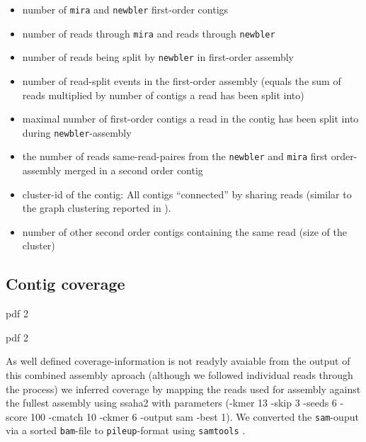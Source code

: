 \documentclass[12pt,a4paper]{article}
\begin{document}
\begin{itemize}
\item number of \texttt{mira} and \texttt{newbler} first-order contigs
\item number of reads through \texttt{mira} and reads through \texttt{newbler}
\item number of reads being split by \texttt{newbler} in first-order
  assembly 
\item number of read-split events in the first-order assembly (equals
  the sum of reads multiplied by number of contigs a read has been
  split into)
\item maximal number of first-order contigs a read in the contig has
  been split into during \texttt{newbler}-assembly 
\item the number of reads same-read-paires from the \texttt{newbler}
  and \texttt{mira} first order-assembly merged in a second order
  contig
\item cluster-id of the contig: All contigs ``connected'' by sharing
  reads (similar to the graph clustering reported in
  \cite{pmid21138572}). 
\item number of other second order contigs containing the same read
  (size of the cluster)
\end{itemize}





\subsection{Contig coverage}


\begin{Schunk}
\begin{Soutput}
pdf 
  2 
\end{Soutput}
\begin{Soutput}
pdf 
  2 
\end{Soutput}
\end{Schunk}

As well defined coverage-information is not readyly avaiable from the
output of this combined assembly aproach (although we followed
individual reads through the process) we inferred coverage by mapping
the reads used for assembly against the fullest assembly using ssaha2
\cite{pmid11591649} with parameters (-kmer 13 -skip 3 -seeds 6 -score
100 -cmatch 10 -ckmer 6 -output sam -best 1). We converted the
\texttt{sam}-ouput via a sorted \texttt{bam}-file to
\texttt{pileup}-format using \texttt{samtools}
\cite{journals/bioinformatics/LiHWFRHMAD09}.
\end{document}
